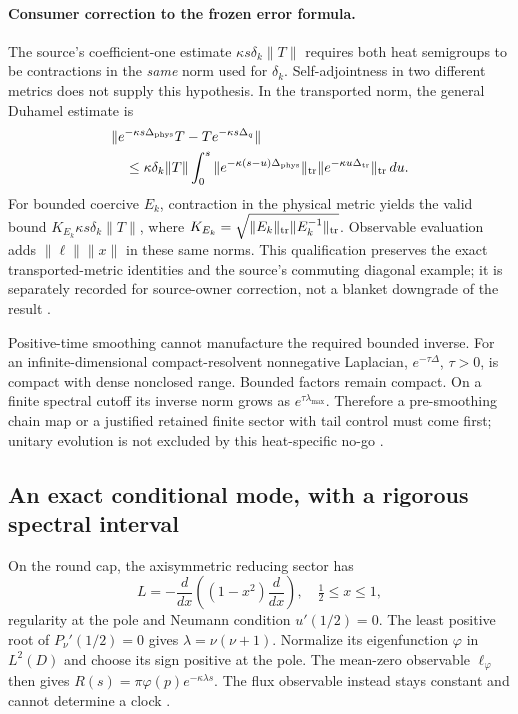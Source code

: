 \documentclass[11pt]{article}
\theoremstyle{definition}
\theoremstyle{remark}
\begin{document}
\paragraph{Consumer correction to the frozen error formula.}
The source's coefficient-one estimate \(\kappa s\delta_k\|T\|\) requires
both heat semigroups to be contractions in the \emph{same} norm used for
\(\delta_k\). Self-adjointness in two different metrics does not supply
this hypothesis. In the transported norm, the general Duhamel estimate is
\[
\begin{split}
&\|e^{-\kappa s\Delta_{\rm phys}}T-Te^{-\kappa s\Delta_q}\|\\
&\quad\leq\kappa\delta_k\|T\|
 \int_0^s\|e^{-\kappa(s-u)\Delta_{\rm phys}}\|_{\rm tr}
              \|e^{-\kappa u\Delta_{\rm tr}}\|_{\rm tr}\,du.
\end{split}
\]
For bounded coercive \(E_k\), contraction in the physical metric yields
the valid bound \(K_{E_k}\kappa s\delta_k\|T\|\), where
\(K_{E_k}=\sqrt{\|E_k\|_{\rm tr}\|E_k^{-1}\|_{\rm tr}}\).
Observable evaluation adds \(\|\ell\|\|x\|\) in these same norms.
This qualification preserves the exact transported-metric identities and
the source's commuting diagonal example; it is separately recorded for
source-owner correction, not a blanket downgrade of the result
\cite{beq40}.

Positive-time smoothing cannot manufacture the required bounded inverse.
For an infinite-dimensional compact-resolvent nonnegative Laplacian,
\(e^{-\tau\Delta}\), \(\tau>0\), is compact with dense nonclosed range.
Bounded factors remain compact. On a finite spectral cutoff its inverse
norm grows as \(e^{\tau\lambda_{\max}}\). Therefore a pre-smoothing chain
map or a justified retained finite sector with tail control must come
first; unitary evolution is not excluded by this heat-specific no-go
\cite{beq37}.

\subsection{An exact conditional mode, with a rigorous spectral interval}
\label{sec:cap-observable}
On the round cap, the axisymmetric reducing sector has
\[
L=-\frac{d}{dx}\left((1-x^2)\frac{d}{dx}\right),\quad
\tfrac12\leq x\leq1,
\]
regularity at the pole and Neumann condition \(u'(1/2)=0\).
The least positive root of \(P_\nu'(1/2)=0\) gives
\(\lambda=\nu(\nu+1)\). Normalize its eigenfunction \(\varphi\) in
\(L^2(D)\) and choose its sign positive at the pole. The mean-zero
observable \(\ell_\varphi\) then gives
\(R(s)=\pi\varphi(p)e^{-\kappa\lambda s}\). The flux observable instead
stays constant and cannot determine a clock \cite{beq32}.
\end{document}
